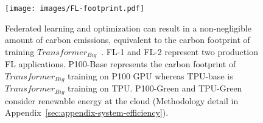     

\begin{figure}[t]
    \centering
    \texttt{[image: images/FL-footprint.pdf]}
    \caption{Federated learning and optimization can result in a non-negligible amount of carbon emissions, equivalent to the carbon footprint of training $Transformer_{Big}$~\cite{Patterson:arxiv:2021}. %
    FL-1 and FL-2 represent two production FL applications.
    P100-Base represents the carbon footprint of $Transformer_{Big}$ training on P100 GPU
    whereas TPU-base is $Transformer_{Big}$ training on TPU. P100-Green and TPU-Green consider renewable energy at the cloud (Methodology detail in Appendix~\ref{sec:appendix-system-efficiency}).}
    \label{fig:fl_carbon}
\end{figure}

